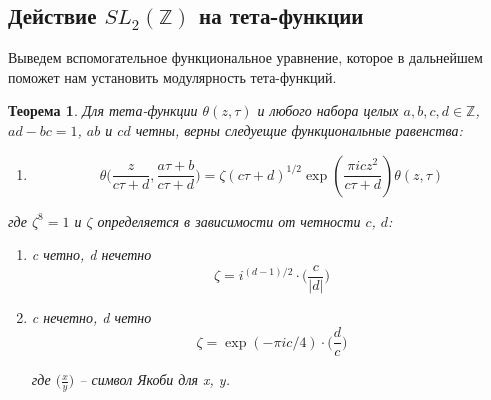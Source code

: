\documentclass{article}
\newcommand{\ZZ}{\mathbb{Z}}
\theoremstyle{break}
\newtheorem{theorem}{Теорема}[section]
\begin{document}
\subsection{Действие $SL_2(\ZZ)$ на тета-функции}
	Выведем вспомогательное функциональное уравнение, которое в дальнейшем поможет нам 
	установить модулярность тета-функций.
\begin{theorem}
	Для тета-функции $\theta(z, \tau)$ и любого набора целых $a, b, c, d \in \ZZ$, $ad - bc=1$, $ab$ и $cd$ четны,  верны следуещие функциональные равенства:
	
	\begin{enumerate}[start=1, label={(\bfseries F\arabic*):}]
		\item 
		$$
		\theta \Big( \frac{z}{c \tau + d}, \frac{a \tau + b}{c \tau + d} \Big) = 
		\zeta (c \tau + d)^{1/2} \exp{(\frac{\pi i c z^2}{c\tau + d})} \theta(z, \tau)
		$$
	\end{enumerate}
	
	где $\zeta^8=1$ и $\zeta$ определяется в зависимости от четности $c$, $d$:
	\begin{enumerate}
		\item c четно, d нечетно
		$$
		\zeta = i^{(d - 1)/2} \cdot \Big( \frac{c}{|d|} \Big)
		$$
		\item c нечетно, d четно
		$$
		\zeta = \exp{(-\pi i c / 4)} \cdot \Big( \frac{d}{c} \Big)
		$$
		
		где $\Big( \frac{x}{y} \Big)$ -- символ Якоби для x, y.
	\end{enumerate}
\end{theorem}
\end{document}
